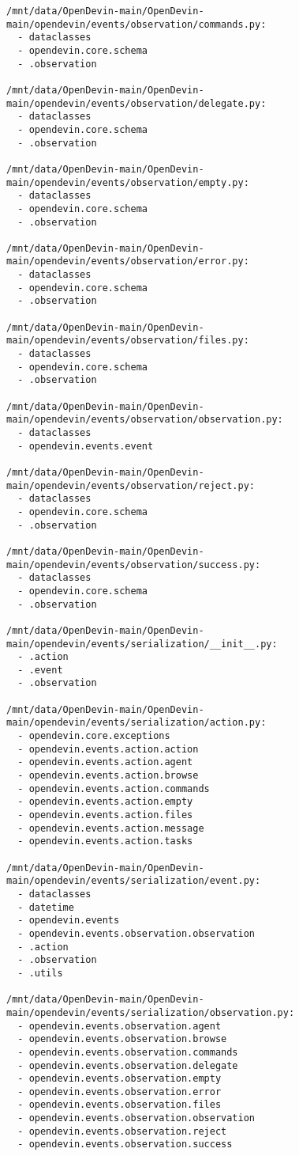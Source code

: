 \documentclass{article}
\begin{document}
\begin{verbatim}
/mnt/data/OpenDevin-main/OpenDevin-main/opendevin/events/observation/commands.py:
  - dataclasses
  - opendevin.core.schema
  - .observation

/mnt/data/OpenDevin-main/OpenDevin-main/opendevin/events/observation/delegate.py:
  - dataclasses
  - opendevin.core.schema
  - .observation

/mnt/data/OpenDevin-main/OpenDevin-main/opendevin/events/observation/empty.py:
  - dataclasses
  - opendevin.core.schema
  - .observation

/mnt/data/OpenDevin-main/OpenDevin-main/opendevin/events/observation/error.py:
  - dataclasses
  - opendevin.core.schema
  - .observation

/mnt/data/OpenDevin-main/OpenDevin-main/opendevin/events/observation/files.py:
  - dataclasses
  - opendevin.core.schema
  - .observation

/mnt/data/OpenDevin-main/OpenDevin-main/opendevin/events/observation/observation.py:
  - dataclasses
  - opendevin.events.event

/mnt/data/OpenDevin-main/OpenDevin-main/opendevin/events/observation/reject.py:
  - dataclasses
  - opendevin.core.schema
  - .observation

/mnt/data/OpenDevin-main/OpenDevin-main/opendevin/events/observation/success.py:
  - dataclasses
  - opendevin.core.schema
  - .observation

/mnt/data/OpenDevin-main/OpenDevin-main/opendevin/events/serialization/__init__.py:
  - .action
  - .event
  - .observation

/mnt/data/OpenDevin-main/OpenDevin-main/opendevin/events/serialization/action.py:
  - opendevin.core.exceptions
  - opendevin.events.action.action
  - opendevin.events.action.agent
  - opendevin.events.action.browse
  - opendevin.events.action.commands
  - opendevin.events.action.empty
  - opendevin.events.action.files
  - opendevin.events.action.message
  - opendevin.events.action.tasks

/mnt/data/OpenDevin-main/OpenDevin-main/opendevin/events/serialization/event.py:
  - dataclasses
  - datetime
  - opendevin.events
  - opendevin.events.observation.observation
  - .action
  - .observation
  - .utils

/mnt/data/OpenDevin-main/OpenDevin-main/opendevin/events/serialization/observation.py:
  - opendevin.events.observation.agent
  - opendevin.events.observation.browse
  - opendevin.events.observation.commands
  - opendevin.events.observation.delegate
  - opendevin.events.observation.empty
  - opendevin.events.observation.error
  - opendevin.events.observation.files
  - opendevin.events.observation.observation
  - opendevin.events.observation.reject
  - opendevin.events.observation.success


\end{verbatim}
\end{document}
